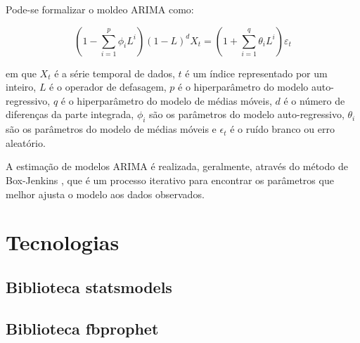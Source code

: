 Pode-se formalizar o moldeo ARIMA como:

\[\left(1-\sum_{i=1}^{p} \phi_{i} L^{i}\right)(1-L)^{d} X_{t}=\left(1+\sum_{i=1}^{q} \theta_{i} L^{i}\right) \varepsilon_{t}\]

em que $X_{t}$ é a série temporal de dados, $t$ é um índice representado por um inteiro, $L$ é o operador de defasagem, $p$ é o hiperparâmetro do modelo auto-regressivo, $q$ é o hiperparâmetro do modelo de médias móveis, $d$ é o número de diferenças da parte integrada, $\phi_{i}$ são os parâmetros do modelo auto-regressivo, $\theta_{i}$ são os parâmetros do modelo de médias móveis e $\epsilon_{t}$ é o ruído branco ou erro aleatório.

A estimação de modelos ARIMA é realizada, geralmente, através do método de Box-Jenkins \cite{box&jenkins}, que é um processo iterativo para encontrar os parâmetros que melhor ajusta o modelo aos dados observados.


\section{Tecnologias}
\subsection{Biblioteca statsmodels}


\subsection{Biblioteca fbprophet}
\cite{fbprophet}


